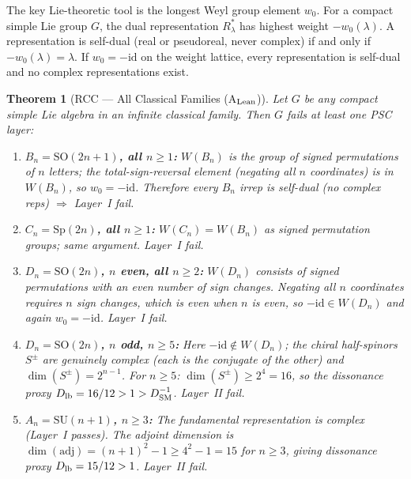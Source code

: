 \documentclass[11pt]{article}
\newtheorem{theorem}{Theorem}[section]
\theoremstyle{remark}
\begin{document}
The key Lie-theoretic tool is the longest Weyl group element $w_0$.  For a compact simple Lie group $G$, the dual representation $R_\lambda^*$ has highest weight $-w_0(\lambda)$.  A representation is self-dual (real or pseudoreal, never complex) if and only if $-w_0(\lambda) = \lambda$.  If $w_0 = -\mathrm{id}$ on the weight lattice, every representation is self-dual and no complex representations exist.

\begin{theorem}[RCC --- All Classical Families (A$_{\rm Lean}$)]
\label{thm:rcc_classical}
Let $G$ be any compact simple Lie algebra in an infinite classical family.  Then $G$ fails at least one PSC layer:
\begin{enumerate}[leftmargin=2em,itemsep=4pt]
  \item \textbf{$B_n = \mathrm{SO}(2n{+}1)$, all $n \ge 1$:}
    $W(B_n)$ is the group of signed permutations of $n$ letters; the total-sign-reversal element (negating all $n$ coordinates) is in $W(B_n)$, so $w_0 = -\mathrm{id}$.  Therefore every $B_n$ irrep is self-dual (no complex reps) $\Rightarrow$ Layer~I fail.

  \item \textbf{$C_n = \mathrm{Sp}(2n)$, all $n \ge 1$:}
    $W(C_n) = W(B_n)$ as signed permutation groups; same argument.  Layer~I fail.

  \item \textbf{$D_n = \mathrm{SO}(2n)$, $n$ even, all $n \ge 2$:}
    $W(D_n)$ consists of signed permutations with an \emph{even} number of sign changes.  Negating all $n$ coordinates requires $n$ sign changes, which is even when $n$ is even, so $-\mathrm{id} \in W(D_n)$ and again $w_0 = -\mathrm{id}$.  Layer~I fail.

  \item \textbf{$D_n = \mathrm{SO}(2n)$, $n$ odd, $n \ge 5$:}
    Here $-\mathrm{id} \notin W(D_n)$; the chiral half-spinors $S^\pm$ are genuinely complex (each is the conjugate of the other) and $\dim(S^\pm) = 2^{n-1}$.  For $n \ge 5$: $\dim(S^\pm) \ge 2^4 = 16$, so the dissonance proxy $D_{\rm lb} = 16/12 > 1 > D_{\rm SM}^{-1}$.  Layer~II fail.

  \item \textbf{$A_n = \mathrm{SU}(n{+}1)$, $n \ge 3$:}
    The fundamental representation is complex (Layer~I passes).  The adjoint dimension is $\dim(\mathrm{adj}) = (n+1)^2 - 1 \ge 4^2 - 1 = 15$ for $n \ge 3$, giving dissonance proxy $D_{\rm lb} = 15/12 > 1$.  Layer~II fail.
\end{enumerate}


\end{theorem}
\end{document}
